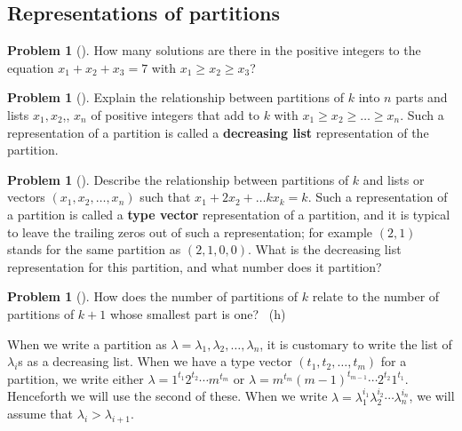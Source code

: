 \documentclass[10pt,]{book}
\newcommand{\terminology}[1]{\textbf{#1}}
\theoremstyle{plain}
\theoremstyle{definition}
\newtheorem{activity}[project]{Problem}
\theoremstyle{definition}
\numberwithin{equation}{chapter}
\begin{document}
\subsection[{Representations of partitions}]{Representations of partitions}\label{subsection-37}
\begin{activity}[] \label{activity-159}
\hypertarget{p-896}{}%
How many solutions are there in the positive integers to the equation \(x_1+x_2+x_3 =7\) with \(x_1\ge x_2\ge x_3\)?%
\end{activity}
\begin{activity}[]\marginsymbol[-1em]{} \label{activity-160}
\hypertarget{p-898}{}%
Explain the relationship between partitions of \(k\) into \(n\) parts and lists \(x_1,x_2\),\textellipsis{}, \(x_n\) of positive integers that add to \(k\) with \(x_1\ge x_2\ge\ldots \ge x_n\). Such a representation of a partition is called a \terminology{decreasing list} representation of the partition.%
\end{activity}
\begin{activity}[] \label{activity-161}
\hypertarget{p-900}{}%
Describe the relationship between partitions of \(k\) and lists or vectors \((x_1,x_2,\ldots,x_n)\) such that \(x_1+2x_2+\ldots kx_k = k\).  Such a representation of a partition is called a \terminology{type vector} representation of a partition, and it is typical to leave the trailing zeros out of such a representation; for example \((2,1)\) stands for the same partition as \((2,1,0,0)\). What is the decreasing list representation for this partition, and what number does it partition?%
\end{activity}
\begin{activity}[]\marginsymbol[-1em]{} \label{activity-162}
\hypertarget{p-902}{}%
How does the number of partitions of \(k\) relate to the number of partitions of \(k+1\) whose smallest part is one?%
~{\tiny (h)}\end{activity}
\hypertarget{p-905}{}%
When we write a partition as \(\lambda = \lambda_1,\lambda_2,\ldots,\lambda_n\), it is customary to write the list of \(\lambda_i\)s as a decreasing list. When we have a type vector \((t_1,t_2,\ldots,t_m)\) for a partition, we write either \(\lambda = 1^{t_1}2^{t_2}\cdots m^{t_m}\) or \(\lambda = m^{t_m}(m-1)^{t_{m-1}}\cdots 2^{t_2}1^{t_1}\). Henceforth we will use the second of these. When we write \(\lambda=\lambda_1^{i_1}\lambda_2^{i_2}\cdots\lambda_n^{i_n}\), we will assume that \(\lambda_i>\lambda_{i+1}\).%
\typeout{************************************************}
\typeout{************************************************}
\end{document}

